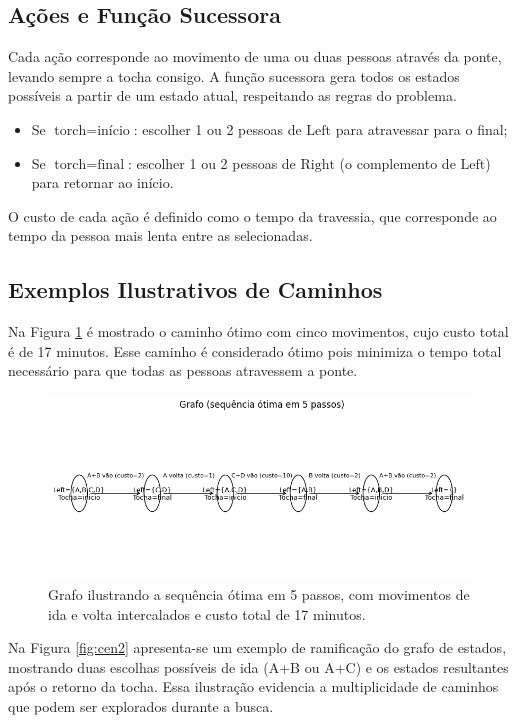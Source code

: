 \documentclass[12pt,a4paper]{article}
\begin{document}
\subsection{Ações e Função Sucessora}
Cada ação corresponde ao movimento de uma ou duas pessoas através da ponte, levando sempre a tocha consigo. A função sucessora gera todos os estados possíveis a partir de um estado atual, respeitando as regras do problema.

\begin{itemize}
    \item Se $\text{torch} = \text{início}$: escolher 1 ou 2 pessoas de $\text{Left}$ para atravessar para o final;
    \item Se $\text{torch} = \text{final}$: escolher 1 ou 2 pessoas de $\text{Right}$ (o complemento de $\text{Left}$) para retornar ao início.
\end{itemize}

O custo de cada ação é definido como o tempo da travessia, que corresponde ao tempo da pessoa mais lenta entre as selecionadas.

\subsection{Exemplos Ilustrativos de Caminhos}
Na Figura \ref{fig:cen1} é mostrado o caminho ótimo com cinco movimentos, cujo custo total é de 17 minutos. Esse caminho é considerado ótimo pois minimiza o tempo total necessário para que todas as pessoas atravessem a ponte.

\begin{figure}[H]
    \centering
    \includegraphics[width=0.8\linewidth]{optimal_path}
    \caption{Grafo ilustrando a sequência ótima em 5 passos, com movimentos de ida e volta intercalados e custo total de 17 minutos.}
    \label{fig:cen1}
\end{figure}

Na Figura \ref{fig:cen2} apresenta-se um exemplo de ramificação do grafo de estados, mostrando duas escolhas possíveis de ida (A+B ou A+C) e os estados resultantes após o retorno da tocha. Essa ilustração evidencia a multiplicidade de caminhos que podem ser explorados durante a busca.
\end{document}
